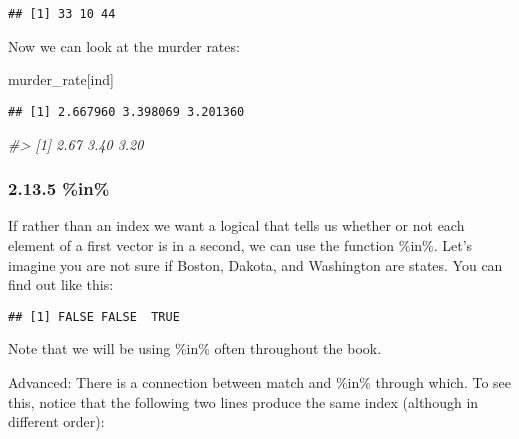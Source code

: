 \documentclass[
]{article}
\newenvironment{Shaded}{\begin{snugshade}}{\end{snugshade}}
\newcommand{\CommentTok}[1]{\textcolor[rgb]{0.56,0.35,0.01}{\textit{#1}}}
\newcommand{\FunctionTok}[1]{\textcolor[rgb]{0.00,0.00,0.00}{#1}}
\newcommand{\NormalTok}[1]{#1}
\newcommand{\SpecialCharTok}[1]{\textcolor[rgb]{0.00,0.00,0.00}{#1}}
\newcommand{\StringTok}[1]{\textcolor[rgb]{0.31,0.60,0.02}{#1}}
\begin{document}
\begin{verbatim}
## [1] 33 10 44
\end{verbatim}

Now we can look at the murder rates:

\begin{Shaded}
\begin{Highlighting}[]
\NormalTok{murder\_rate[ind]}
\end{Highlighting}
\end{Shaded}

\begin{verbatim}
## [1] 2.667960 3.398069 3.201360
\end{verbatim}

\begin{Shaded}
\begin{Highlighting}[]
\CommentTok{\#\textgreater{} [1] 2.67 3.40 3.20}
\end{Highlighting}
\end{Shaded}

\hypertarget{in}{%
\subsubsection{2.13.5 \%in\%}\label{in}}

If rather than an index we want a logical that tells us whether or not
each element of a first vector is in a second, we can use the function
\%in\%. Let's imagine you are not sure if Boston, Dakota, and Washington
are states. You can find out like this:

\begin{Shaded}
\end{Shaded}

\begin{verbatim}
## [1] FALSE FALSE  TRUE
\end{verbatim}

Note that we will be using \%in\% often throughout the book.

Advanced: There is a connection between match and \%in\% through which.
To see this, notice that the following two lines produce the same index
(although in different order):

\begin{Shaded}
\end{Shaded}
\end{document}
